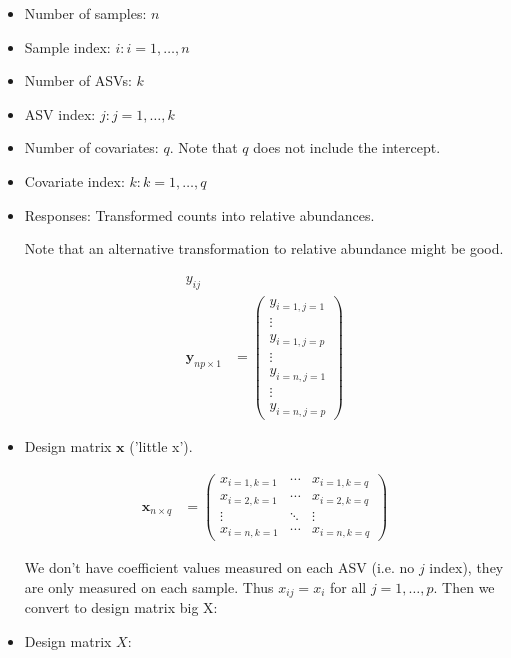 \documentclass[10pt]{article}
\theoremstyle{definition}
\begin{document}
\begin{itemize}
  \item Number of samples: $n$
  \item Sample index: $i: i = 1, \ldots, n$
  \item Number of ASVs: $k$
  \item ASV index: $j: j = 1, \ldots , k$
  \item Number of covariates: $q$. Note that $q$ does not include the intercept.
  \item Covariate index: $k: k = 1, \ldots , q$

  \item Responses: Transformed counts into relative abundances.

  Note that an alternative transformation to relative abundance might be good. %

   \begin{align*}
     y_{ij}\\
     \textbf{y}_{np \times 1} &= \begin{pmatrix} y_{i = 1, j = 1} \\\vdots \\ y_{i = 1, j = p}\\ \vdots \\ y_{i = n, j = 1} \\ \vdots  \\y_{i = n, j = p}\end{pmatrix}
   \end{align*}

   \item

   Design matrix $\mathbf{x}$ ('little x').

\begin{align*}
  \mathbf{x}_{n \times q} &= \begin{pmatrix}x_{i=1, k = 1} & \cdots & x_{i = 1, k = q}\\
  x_{i=2, k = 1} & \cdots & x_{i = 2, k = q}\\
\vdots & \ddots &  \vdots \\
x_{i = n, k = 1} & \cdots & x_{i = n, k = q}\end{pmatrix}
\end{align*}


    We don't have coefficient values measured on each ASV (i.e. no $j$ index), they are only measured on each sample. Thus $x_{ij} = x_{i}$ for all $j = 1, \ldots , p$. Then we convert to design matrix big X:

   \item Design matrix $X$:


\end{itemize}
\end{document}
